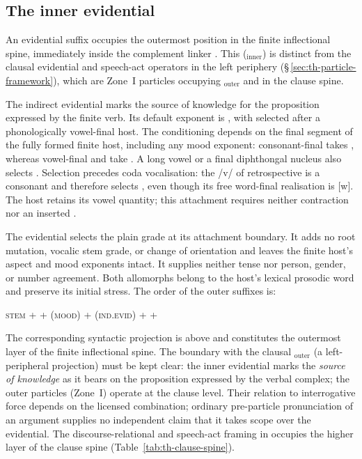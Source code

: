 \subsection{The inner evidential}
\label{sec:vm-evid}

An evidential suffix occupies the outermost position in the finite inflectional
spine, immediately inside the complement linker . This  ($_\text{inner}$) is distinct from the clausal
evidential and speech-act operators in the left periphery
(§\,\ref{sec:th-particle-framework}), which are Zone~I particles occupying
$_\text{outer}$ and  in the clause spine.

The indirect evidential marks the source of knowledge for the proposition
expressed by the finite verb. Its default exponent is , with
 selected after a phonologically vowel-final host. The conditioning
depends on the final segment of the fully formed finite host, including any
mood exponent: consonant-final  takes , whereas
vowel-final  and  take . A long vowel
or a final diphthongal nucleus also selects . Selection precedes
coda vocalisation: the /v/ of retrospective  is a consonant
and therefore selects , even though its free word-final
realisation is [w]. The host retains its vowel quantity; this attachment
requires neither contraction nor an inserted .

The evidential selects the plain grade at its attachment boundary. It adds
no root mutation, vocalic stem grade, or change of orientation and leaves
the finite host's aspect and mood exponents intact. It supplies neither
tense nor person, gender, or number agreement. Both allomorphs belong to
the host's lexical prosodic word and preserve its initial stress.
The order of the outer suffixes is:

\begin{center}
\textsc{stem} +  + (\textsc{mood}) +
(\textsc{ind.evid}) +  + 
\end{center}

\noindent The corresponding syntactic projection is above
 and constitutes the outermost layer of the finite inflectional
spine. The boundary with the clausal $_\text{outer}$ (a
left-peripheral projection) must be kept clear: the inner evidential marks the
\emph{source of knowledge} as it bears on the proposition expressed by the
verbal complex; the outer  particles (Zone~I) operate at the
clause level. Their relation to interrogative force depends on the licensed
combination; ordinary pre-particle pronunciation of an argument supplies no
independent claim that it takes scope over the evidential. The discourse-relational and speech-act framing in
 occupies the higher layer of the clause spine
(Table~\ref{tab:th-clause-spine}).

